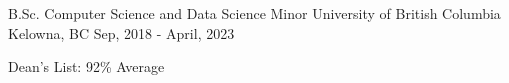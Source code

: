 

\begin{cventries}

  \cventry
    {B.Sc. Computer Science and Data Science Minor} %
    {University of British Columbia} %
    {Kelowna, BC} %
    {Sep, 2018 - April, 2023} %
    {
      \begin{cvitems} %
        \item {Dean's List: 92\% Average}
      \end{cvitems}
    }

\end{cventries}
